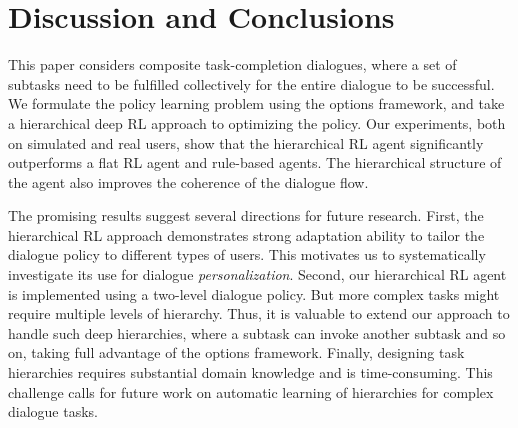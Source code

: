 \documentclass[11pt,letterpaper]{article}
\begin{document}

\section{Discussion and Conclusions}

This paper considers composite task-completion dialogues, where a set of subtasks need to be fulfilled collectively for the entire dialogue to be successful. We formulate the policy learning problem using the options framework, and take a hierarchical deep RL approach to optimizing the policy. Our experiments, both on simulated and real users, show that the hierarchical RL agent significantly outperforms a flat RL agent and rule-based agents. The hierarchical structure of the agent also improves the coherence of the dialogue flow.

The promising results suggest several directions for future research. First, the hierarchical RL approach demonstrates strong adaptation ability to tailor the dialogue policy to different types of users. This motivates us to systematically investigate its use for dialogue \textit{personalization}. Second, our hierarchical RL agent is implemented using a two-level dialogue policy. But more complex tasks might require multiple levels of hierarchy. Thus, it is valuable to extend our approach to handle such deep hierarchies, where a subtask can invoke another subtask and so on, taking full advantage of the options framework. Finally, designing task hierarchies requires substantial domain knowledge and is time-consuming. This challenge calls for future work on automatic learning of hierarchies for complex dialogue tasks.
\end{document}
